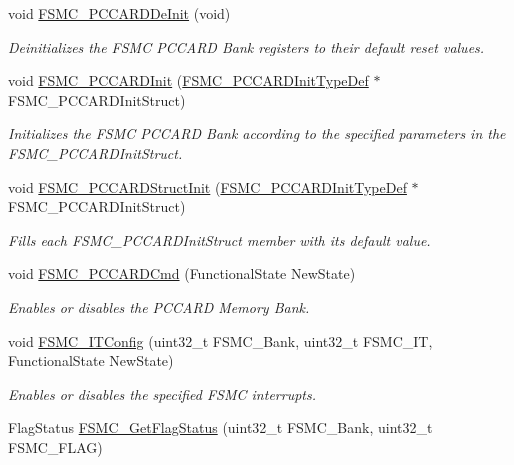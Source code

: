 \begin{DoxyCompactItemize}
void \hyperlink{group___f_s_m_c_ga2f53ccf3a4f3c80a5a56fb47ccd47ccd}{F\-S\-M\-C\-\_\-\-P\-C\-C\-A\-R\-D\-De\-Init} (void)
\begin{DoxyCompactList}\small\item\em Deinitializes the F\-S\-M\-C P\-C\-C\-A\-R\-D Bank registers to their default reset values. \end{DoxyCompactList}\item 
void \hyperlink{group___f_s_m_c_gacee1351363e7700a296faa1734a910aa}{F\-S\-M\-C\-\_\-\-P\-C\-C\-A\-R\-D\-Init} (\hyperlink{struct_f_s_m_c___p_c_c_a_r_d_init_type_def}{F\-S\-M\-C\-\_\-\-P\-C\-C\-A\-R\-D\-Init\-Type\-Def} $\ast$F\-S\-M\-C\-\_\-\-P\-C\-C\-A\-R\-D\-Init\-Struct)
\begin{DoxyCompactList}\small\item\em Initializes the F\-S\-M\-C P\-C\-C\-A\-R\-D Bank according to the specified parameters in the F\-S\-M\-C\-\_\-\-P\-C\-C\-A\-R\-D\-Init\-Struct. \end{DoxyCompactList}\item 
void \hyperlink{group___f_s_m_c_ga7a64ba0e0545b3f1913c9d1d28c05e62}{F\-S\-M\-C\-\_\-\-P\-C\-C\-A\-R\-D\-Struct\-Init} (\hyperlink{struct_f_s_m_c___p_c_c_a_r_d_init_type_def}{F\-S\-M\-C\-\_\-\-P\-C\-C\-A\-R\-D\-Init\-Type\-Def} $\ast$F\-S\-M\-C\-\_\-\-P\-C\-C\-A\-R\-D\-Init\-Struct)
\begin{DoxyCompactList}\small\item\em Fills each F\-S\-M\-C\-\_\-\-P\-C\-C\-A\-R\-D\-Init\-Struct member with its default value. \end{DoxyCompactList}\item 
void \hyperlink{group___f_s_m_c_ga2d410151ceb3428c6a1bf374a0472cde}{F\-S\-M\-C\-\_\-\-P\-C\-C\-A\-R\-D\-Cmd} (Functional\-State New\-State)
\begin{DoxyCompactList}\small\item\em Enables or disables the P\-C\-C\-A\-R\-D Memory Bank. \end{DoxyCompactList}\item 
void \hyperlink{group___f_s_m_c_ga217027ae3cd213b9076b6a1be197064c}{F\-S\-M\-C\-\_\-\-I\-T\-Config} (uint32\-\_\-t F\-S\-M\-C\-\_\-\-Bank, uint32\-\_\-t F\-S\-M\-C\-\_\-\-I\-T, Functional\-State New\-State)
\begin{DoxyCompactList}\small\item\em Enables or disables the specified F\-S\-M\-C interrupts. \end{DoxyCompactList}\item 
Flag\-Status \hyperlink{group___f_s_m_c_gae00355115b078f483f0771057bb849c4}{F\-S\-M\-C\-\_\-\-Get\-Flag\-Status} (uint32\-\_\-t F\-S\-M\-C\-\_\-\-Bank, uint32\-\_\-t F\-S\-M\-C\-\_\-\-F\-L\-A\-G)

\end{DoxyCompactItemize}
